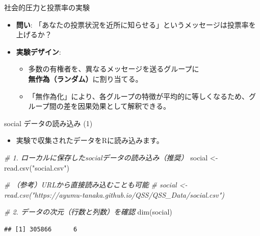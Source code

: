 \documentclass[
  ignorenonframetext,
]{beamer}
\newenvironment{Shaded}{\begin{snugshade}}{\end{snugshade}}
\newcommand{\CommentTok}[1]{\textcolor[rgb]{0.56,0.35,0.01}{\textit{#1}}}
\newcommand{\FunctionTok}[1]{\textcolor[rgb]{0.00,0.00,0.00}{#1}}
\newcommand{\NormalTok}[1]{#1}
\newcommand{\OtherTok}[1]{\textcolor[rgb]{0.56,0.35,0.01}{#1}}
\newcommand{\StringTok}[1]{\textcolor[rgb]{0.31,0.60,0.02}{#1}}
\providecommand{\tightlist}{%
  \setlength{\itemsep}{0pt}\setlength{\parskip}{0pt}}
\begin{document}
\begin{frame}{社会的圧力と投票率の実験}
\protect\hypertarget{ux793eux4f1aux7684ux5727ux529bux3068ux6295ux7968ux7387ux306eux5b9fux9a13}{}
\begin{itemize}
\tightlist
\item
  \textbf{問い}:
  「あなたの投票状況を近所に知らせる」というメッセージは投票率を上げるか？
\item
  \textbf{実験デザイン}:

  \begin{itemize}
  \tightlist
  \item
    多数の有権者を、異なるメッセージを送るグループに\textbf{無作為（ランダム）}に割り当てる。
  \item
    「無作為化」により、各グループの特徴が平均的に等しくなるため、グループ間の差を因果効果として解釈できる。
  \end{itemize}
\end{itemize}
\end{frame}

\begin{frame}[fragile]{social データの読み込み (1)}
\protect\hypertarget{social-ux30c7ux30fcux30bfux306eux8aadux307fux8fbcux307f-1}{}
\begin{itemize}
\tightlist
\item
  実験で収集されたデータをRに読み込みます。
\end{itemize}

\scriptsize

\begin{Shaded}
\begin{Highlighting}[]
\CommentTok{\# 1. ローカルに保存したsocialデータの読み込み（推奨）}
\NormalTok{social }\OtherTok{\textless{}{-}} \FunctionTok{read.csv}\NormalTok{(}\StringTok{"social.csv"}\NormalTok{)}

\CommentTok{\# （参考）URLから直接読み込むことも可能}
\CommentTok{\# social \textless{}{-} read.csv("https://ayumu{-}tanaka.github.io/QSS/QSS\_Data/social.csv")}

\CommentTok{\# 2. データの次元（行数と列数）を確認}
\FunctionTok{dim}\NormalTok{(social)}
\end{Highlighting}
\end{Shaded}

\begin{verbatim}
## [1] 305866      6
\end{verbatim}

\normalsize
\end{frame}
\end{document}
